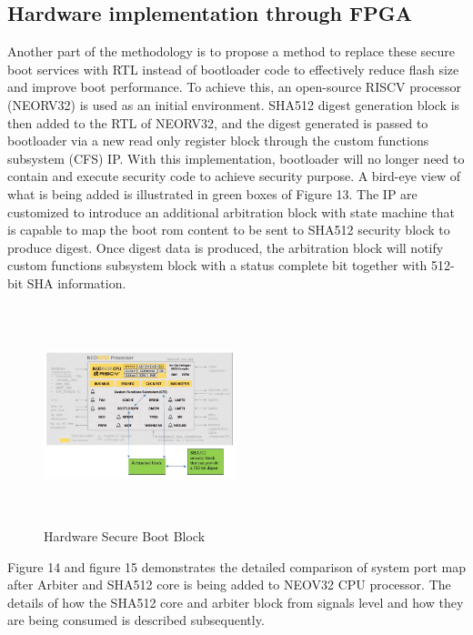 \documentclass[a4paper,fleqn]{cas-dc}
\begin{document}
\subsection{ Hardware implementation through FPGA}
Another part of the methodology is to propose a method to replace these secure boot services with RTL instead of bootloader code to effectively reduce flash size and improve boot performance. To achieve this, an open-source RISCV processor (NEORV32) is used as an initial environment. SHA512 digest generation block is then added to the RTL of NEORV32, and the digest generated is passed to bootloader via a new read only register block through the custom functions subsystem (CFS) IP. With this implementation, bootloader will no longer need to contain and execute security code to achieve security purpose. A bird-eye view of what is being added is illustrated in green boxes of Figure 13. The IP are customized to introduce an additional arbitration block with state machine that is capable to map the boot rom content to be sent to SHA512 security block to produce digest. Once digest data is produced, the arbitration block will notify custom functions subsystem block with a status complete bit together with 512-bit SHA information. 

\begin{figure}[hbt!]
	\centering
	\includegraphics[width=0.5\textwidth,height=2.5in]{figs/HardwareSecureBootBlock.JPG}
	\caption{Hardware Secure Boot Block}
\end{figure}


Figure 14 and figure 15 demonstrates the detailed comparison of system port map after Arbiter and SHA512 core is being added to NEOV32 CPU processor. The details of how the SHA512 core and arbiter block from signals level and how they are being consumed is described subsequently.
\end{document}
